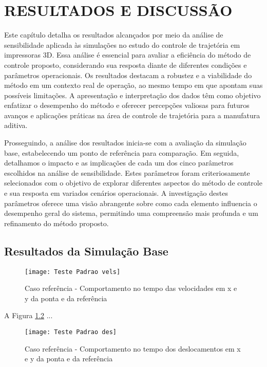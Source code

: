 \chapter{RESULTADOS E DISCUSSÃO}
Este capítulo detalha os resultados alcançados por meio da análise de sensibilidade aplicada às simulações no estudo do controle de trajetória em impressoras 3D. Essa análise é essencial para avaliar a eficiência do método de controle proposto, considerando sua resposta diante de diferentes condições e parâmetros operacionais. Os resultados destacam a robustez e a viabilidade do método em um contexto real de operação, ao mesmo tempo em que apontam suas possíveis limitações. A apresentação e interpretação dos dados têm como objetivo enfatizar o desempenho do método e oferecer percepções valiosas para futuros avanços e aplicações práticas na área de controle de trajetória para a manufatura aditiva.

Prosseguindo, a análise dos resultados inicia-se com a avaliação da simulação base, estabelecendo um ponto de referência para comparação. Em seguida, detalhamos o impacto e as implicações de cada um dos cinco parâmetros escolhidos na análise de sensibilidade. Estes parâmetros foram criteriosamente selecionados com o objetivo de explorar diferentes aspectos do método de controle e sua resposta em variados cenários operacionais. A investigação destes parâmetros oferece uma visão abrangente sobre como cada elemento influencia o desempenho geral do sistema, permitindo uma compreensão mais profunda e um refinamento do método proposto.

\section{Resultados da Simulação Base}

\begin{figure}[H]
    \begin{center}
    \caption{Caso referência - Comportamento no tempo das velocidades em x e y da ponta e da referência}
    \texttt{[image: Teste Padrao vels]}
    \label{fig:t_padr_vels}
    \end{center}
\end{figure}

A Figura \ref{fig:t_padr_des} ...

\begin{figure}[H]
    \begin{center}
    \caption{Caso referência - Comportamento no tempo dos deslocamentos em x e y da ponta e da referência}
    \texttt{[image: Teste Padrao des]}
    \label{fig:t_padr_des}
    \end{center}
\end{figure}

